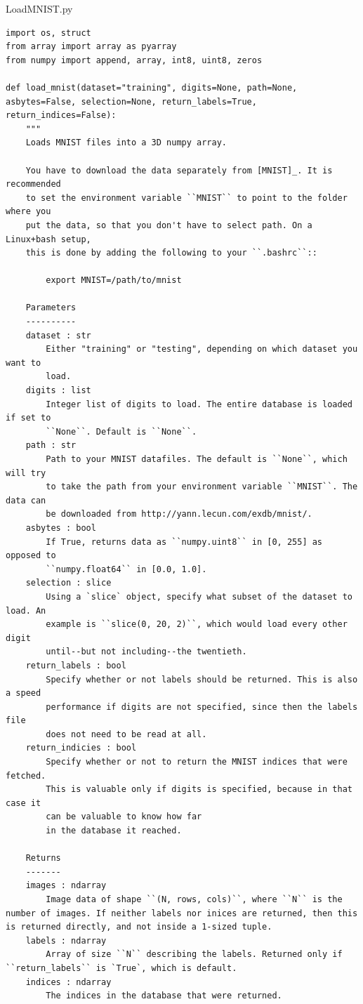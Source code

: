 \documentclass{article}
\begin{document}
LoadMNIST.py
\begin{lstlisting}
import os, struct
from array import array as pyarray 
from numpy import append, array, int8, uint8, zeros

def load_mnist(dataset="training", digits=None, path=None, asbytes=False, selection=None, return_labels=True, return_indices=False):
    """
    Loads MNIST files into a 3D numpy array.

    You have to download the data separately from [MNIST]_. It is recommended
    to set the environment variable ``MNIST`` to point to the folder where you
    put the data, so that you don't have to select path. On a Linux+bash setup,
    this is done by adding the following to your ``.bashrc``::

        export MNIST=/path/to/mnist

    Parameters
    ----------
    dataset : str 
        Either "training" or "testing", depending on which dataset you want to
        load. 
    digits : list 
        Integer list of digits to load. The entire database is loaded if set to
        ``None``. Default is ``None``.
    path : str 
        Path to your MNIST datafiles. The default is ``None``, which will try
        to take the path from your environment variable ``MNIST``. The data can
        be downloaded from http://yann.lecun.com/exdb/mnist/.
    asbytes : bool
        If True, returns data as ``numpy.uint8`` in [0, 255] as opposed to
        ``numpy.float64`` in [0.0, 1.0].
    selection : slice
        Using a `slice` object, specify what subset of the dataset to load. An
        example is ``slice(0, 20, 2)``, which would load every other digit
        until--but not including--the twentieth.
    return_labels : bool
        Specify whether or not labels should be returned. This is also a speed
        performance if digits are not specified, since then the labels file
        does not need to be read at all.
    return_indicies : bool
        Specify whether or not to return the MNIST indices that were fetched.
        This is valuable only if digits is specified, because in that case it
        can be valuable to know how far
        in the database it reached.

    Returns
    -------
    images : ndarray
        Image data of shape ``(N, rows, cols)``, where ``N`` is the number of images. If neither labels nor inices are returned, then this is returned directly, and not inside a 1-sized tuple.
    labels : ndarray
        Array of size ``N`` describing the labels. Returned only if ``return_labels`` is `True`, which is default.
    indices : ndarray
        The indices in the database that were returned.


\end{lstlisting}
\end{document}
